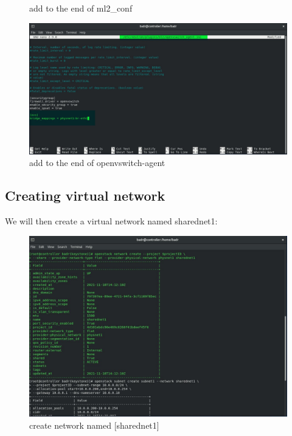 \begin{spacing}{1.2}
\begin{figure}[!htb]
\begin{center}
\end{center} 
\caption{add to the end of ml2_conf} 
\end{figure} 
\FloatBarrier
\begin{figure}[!htb] 
\begin{center} 
\includegraphics[width=1\linewidth]{Cloud/Configuring Neutron Networking/add to the end of openvswitch-agent} 
\end{center} 
\caption{add to the end of openvswitch-agent} 
\end{figure} 
\FloatBarrier

\subsection{Creating virtual network}
\par We will then create a virtual network named sharednet1: 
\\
\begin{figure}[!htb] 
\begin{center} 
\includegraphics[width=1\linewidth]{Cloud/Configuring Neutron Networking/create network named [sharednet1]} 
\end{center} 
\caption{create network named [sharednet1]} 
\end{figure} 
\FloatBarrier


\end{spacing}
